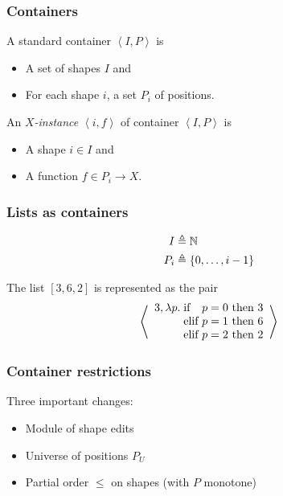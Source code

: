 \documentclass[table]{beamer}
\begin{document}
\begin{frame}
    \frametitle{Containers}
    A standard container $\left<I,P\right>$ is
    \begin{itemize}
        \item A set of shapes $I$ and
        \item For each shape $i$, a set $P_i$ of positions.
    \end{itemize}
    An \emph{$X$-instance} $\left<i,f\right>$ of container $\left<I,P\right>$ is
    \begin{itemize}
        \item A shape $i \in I$ and
        \item A function $f \in P_i \to X$.
    \end{itemize}
\end{frame}

\begin{frame}
    \frametitle{Lists as containers}
    \begin{align*}
        I   &\triangleq \mathbb{N} \\
        P_i &\triangleq \{0,\ldots,i-1\}
    \end{align*}

    \vpause

    The list $[3,6,2]$ is represented as the pair
    \[\left<\begin{array}{l@{\;}l@{\ }r@{}l}3,\lambda p.
        &\mbox{if}  &p=0\mbox{ then }&3\\
        &\mbox{elif}&p=1\mbox{ then }&6\\
        &\mbox{elif}&p=2\mbox{ then }&2
    \end{array}\right>\]
\end{frame}

\begin{frame}
    \frametitle{Container restrictions}
    Three important changes:

    \begin{itemize}
        \item Module of shape edits
        \item Universe of positions $P_U$
        \item Partial order $\le$ on shapes (with $P$ monotone)
    \end{itemize}
\end{frame}
\end{document}
